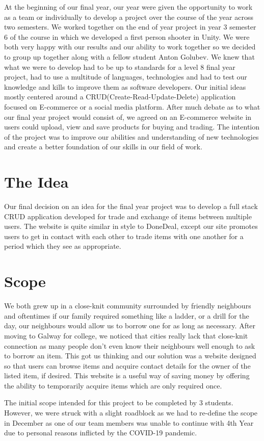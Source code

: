 At the beginning of our final year, our year were given the opportunity to work as a team or individually to develop a project over the course of the year across two semesters. We worked together on the end of year project in year 3 semester 6 of the course in which we developed a first person shooter in Unity. We were both very happy with our results and our ability to work together so we decided to group up together along with a fellow student Anton Golubev. We knew that what we were to develop had to be up to standards for a level 8 final year project, had to use a multitude of languages, technologies and had to test our knowledge and kills to improve them as software developers. Our initial ideas mostly centered around a CRUD(Create-Read-Update-Delete) application focused on E-commerce or a social media platform. After much debate as to what our final year project would consist of, we agreed on an E-commerce website in users could upload, view and save products for buying and trading. The intention of the project was to improve our abilities and understanding of new technologies and create a better foundation of our skills in our field of work.

\section{The Idea}
Our final decision on an idea for the final year project was to develop a full stack CRUD application developed for trade and exchange of items between multiple users. The website is quite similar in style to DoneDeal, except our site promotes users to get in contact with each other to trade items with one another for a period which they see as appropriate.

\section{Scope}
We both grew up in a close-knit community surrounded by friendly neighbours and oftentimes if our family required something like a ladder, or a drill for the day, our neighbours would allow us to borrow one for as long as necessary. After moving to Galway for college, we noticed that cities really lack that close-knit connection as many people don't even know their neighbours well enough to ask to borrow an item. This got us thinking and our solution was a website designed so that users can browse items and acquire contact details for the owner of the listed item, if desired. This website is a useful way of saving money by offering the ability to temporarily acquire items which are only required once. \par
The initial scope intended for this project to be completed by 3 students. However, we were struck with a slight roadblock as we had to re-define the scope in December as one of our team members was unable to continue with 4th Year due to personal reasons inflicted by the COVID-19 pandemic.

